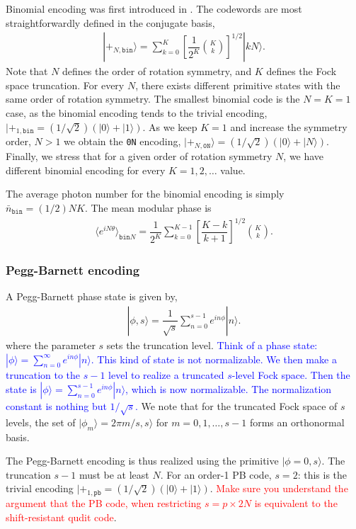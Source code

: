 \documentclass{article}
\begin{document}
Binomial encoding was first introduced in \cite{PhysRevX.6.031006}. The codewords are most straightforwardly defined in the conjugate basis,
\begin{align}
    |+_{N,\texttt{bin}}\rangle = \sum_{k=0}^{K}\left[\dfrac{1}{2^K}\binom{K}{k}\right]^{1/2}|kN\rangle. 
\end{align}
Note that $N$ defines the order of rotation symmetry, and $K$ defines the Fock space truncation. For every $N$, there exists different primitive states with the same order of rotation symmetry. The smallest binomial code is the $N=K=1$ case, as the binomial encoding tends to the trivial encoding, $|+_{1,\texttt{bin}}=(1/\sqrt{2})(|0\rangle+|1\rangle)$. As we keep $K=1$ and increase the symmetry order, $N>1$ we obtain the \texttt{0N} encoding, $|+_{N,\texttt{0N}}\rangle=(1/\sqrt{2})(|0\rangle+|N\rangle)$. Finally, we stress that for a given order of rotation symmetry $N$, we have different binomial encoding for every $K=1,2,\dots$ value.

The average photon number for the binomial encoding is simply $\bar{n}_{\texttt{bin}}=(1/2)NK$. The mean modular phase is 
\begin{align}
    \langle e^{iN\theta}\rangle_{\texttt{bin}N} = \dfrac{1}{2^K}\sum_{k=0}^{K-1}\left[\dfrac{K-k}{k+1}\right]^{1/2}\binom{K}{k}.
\end{align}

\subsubsection{Pegg-Barnett encoding}

A Pegg-Barnett phase state is given by,
\begin{align}
    |\phi, s\rangle = \dfrac{1}{\sqrt{s}}\sum_{n=0}^{s-1}e^{in\phi}|n\rangle. 
\end{align}
where the parameter $s$ sets the truncation level. \textcolor{blue}{Think of a phase state: $|\phi\rangle=\sum_{n=0}^\infty e^{in\phi}|n\rangle$. This kind of state is not normalizable. We then make a truncation to the $s-1$ level to realize a truncated $s$-level Fock space. Then the state is $|\phi\rangle=\sum_{n=0}^{s-1}e^{in\phi}|n\rangle$, which is now normalizable. The normalization constant is nothing but $1/\sqrt{s}$.} We note that for the truncated Fock space of $s$ levels, the set of $|\phi_m\rangle=2\pi m/s, s\rangle$ for $m=0, 1,\dots,s-1$ forms an orthonormal basis. 

The Pegg-Barnett encoding is thus realized using the primitive $|\phi=0, s\rangle$. The truncation $s-1$ must be at least $N$. For an order-1 PB code, $s=2$: this is the trivial encoding $|+_{1,\texttt{pb}}=(1/\sqrt{2})(|0\rangle+|1\rangle)$. \textcolor{red}{Make sure you understand the argument that the PB code, when restricting $s=p\times 2N$ is equivalent to the shift-resistant qudit code}. 
\end{document}
